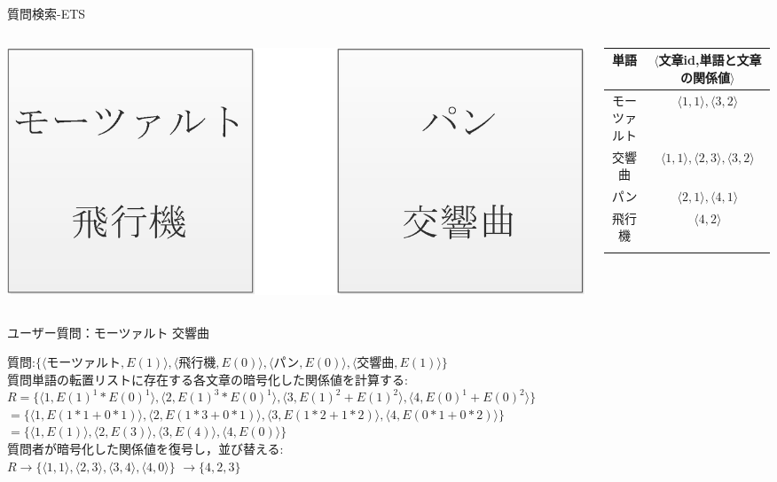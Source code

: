 \documentclass[14pt,xcolor=dvipsnames,table,dvipdfmx]{beamer}
\begin{document}
\begin{frame}{質問検索-ETS}
	\begin{exampleblock}{}
      		 \begin{columns}[c]
           		\begin{column}{0.3\textwidth} %
               		\includegraphics[width=\columnwidth]{rk16.png}
		   	\end{column}
       		\begin{column}{0.68\textwidth} %
\fontsize{9pt}{7.2}\selectfont
				\begin{tabular}{|c|c|}
				\noalign{\hrule height 1pt}
				単語 & $\langle$文章id,単語と文章の関係値$\rangle$ \\
				\hline
				モーツァルト & $\langle1,1\rangle,\langle3,2\rangle$\\
				交響曲 & $\langle1,1\rangle,\langle2,3\rangle,\langle3,2\rangle$ \\
				パン & $\langle2,1\rangle,\langle4,1\rangle$ \\
				飛行機 & $\langle4,2\rangle$ \\
				\noalign{\hrule height 1pt}
				\end{tabular}\\
			\end{column}
		\end{columns}
		ユーザー質問：モーツァルト 交響曲
	\end{exampleblock}
	\begin{block}{}
	\fontsize{10pt}{7.2}\selectfont
   		質問:$\{ \langle$モーツァルト$,E(1)\rangle,\langle$飛行機$,E(0)\rangle,\langle$パン$,E(0)\rangle,\langle$交響曲$,E(1)\rangle \}$\\
		質問単語の転置リストに存在する各文章の暗号化した関係値を計算する:\\
		$R = \{ \langle1,E(1)^1*E(0)^1\rangle,\langle2,E(1)^3*E(0)^1\rangle,\langle3,E(1)^2+E(1)^2\rangle,\langle4,E(0)^1+E(0)^2\rangle \} $\\
		$= \{ \langle1,E(1*1+0*1)\rangle,\langle2,E(1*3+0*1)\rangle,\langle3,E(1*2+1*2)\rangle,\langle4,E(0*1+0*2)\rangle \} $\\
		$= \{ \langle1,E(1)\rangle,\langle2,E(3)\rangle,\langle3,E(4)\rangle,\langle4,E(0)\rangle \}$\\
		質問者が暗号化した関係値を復号し，並び替える:\\
		$R \rightarrow \{ \langle1,1\rangle,\langle2,3\rangle,\langle3,4\rangle,\langle4,0\rangle \}$
		$\rightarrow  \{ 4,2,3 \}$
	\end{block}
\end{frame}
\end{document}

